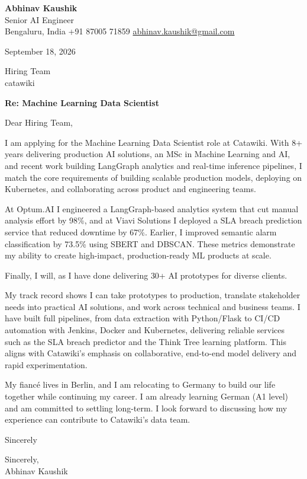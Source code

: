 \documentclass[11pt,a4paper]{article}
\begin{document}
{\Large\bfseries Abhinav Kaushik}\\
Senior AI Engineer\\
Bengaluru, India \textbar{} +91 87005 71859 \textbar{} \href{mailto:abhinav.kaushik@gmail.com}{abhinav.kaushik@gmail.com}

September 18, 2026

Hiring Team\\
catawiki

\textbf{Re: Machine Learning Data Scientist}

Dear Hiring Team,

I am applying for the Machine Learning Data Scientist role at Catawiki. With 8+ years delivering production AI solutions, an MSc in Machine Learning and AI, and recent work building LangGraph analytics and real-time inference pipelines, I match the core requirements of building scalable production models, deploying on Kubernetes, and collaborating across product and engineering teams.

At Optum.AI I engineered a LangGraph-based analytics system that cut manual analysis effort by 98\%, and at Viavi Solutions I deployed a SLA breach prediction service that reduced downtime by 67\%. Earlier, I improved semantic alarm classification by 73.5\% using SBERT and DBSCAN. These metrics demonstrate my ability to create high-impact, production-ready ML products at scale.

Finally, I will, as I have done delivering 30+ AI prototypes for diverse clients.

My track record shows I can take prototypes to production, translate stakeholder needs into practical AI solutions, and work across technical and business teams. I have built full pipelines, from data extraction with Python/Flask to CI/CD automation with Jenkins, Docker and Kubernetes, delivering reliable services such as the SLA breach predictor and the Think Tree learning platform. This aligns with Catawiki's emphasis on collaborative, end-to-end model delivery and rapid experimentation.

My fiancé lives in Berlin, and I am relocating to Germany to build our life together while continuing my career. I am already learning German (A1 level) and am committed to settling long-term. I look forward to discussing how my experience can contribute to Catawiki's data team.

Sincerely

Sincerely,\\[4pt]
Abhinav Kaushik
\end{document}
